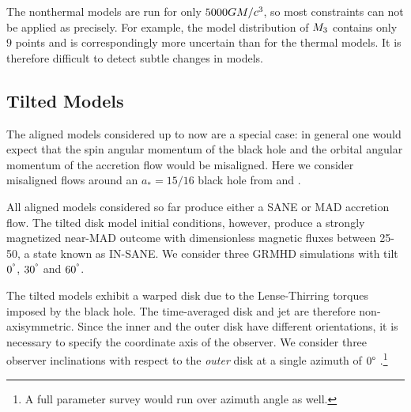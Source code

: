 



The nonthermal models are run for only $5000GM/c^3$, so most  constraints can not be applied as precisely.  For example, the model distribution of $M_{3}$ contains only $9$ points and is correspondingly more uncertain than for the thermal models.  It is therefore difficult to detect subtle changes in models.

\subsection{Tilted Models}

The aligned models considered up to now are a special case: in general one would expect that the spin angular momentum of the black hole and the orbital angular momentum of the accretion flow would be misaligned. Here we consider misaligned flows around an $a_*=15/16$ black hole from \citet{Liska2018} and \citet{Chatterjee2020}.

All aligned models considered so far produce either a SANE or MAD accretion flow.  The tilted disk model initial conditions, however, produce a strongly magnetized near-MAD outcome with dimensionless magnetic fluxes between 25-50, a state known as IN-SANE.  We consider three GRMHD simulations with tilt $0^{\degree}$, $30^{\degree}$ and $60^{\degree}$.

The tilted models exhibit a warped disk due to the Lense-Thirring torques imposed by the black hole.  The time-averaged disk and jet are therefore non-axisymmetric.
Since the inner and the outer disk have different orientations, it is necessary to specify the coordinate axis of the observer.  We consider three  observer inclinations with respect to the {\em outer} disk at a single azimuth of $0\degree$ \citep[for more details, see][]{Chatterjee2020}.\footnote{A full parameter survey would run over azimuth angle as well.}  

